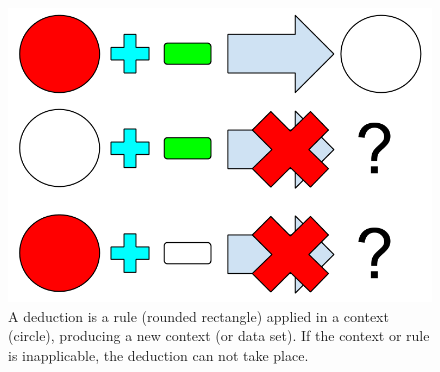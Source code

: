\begin{figure}[h]
  \includegraphics[scale=0.5]{figures/deduction}
  \caption[A deduction is a rule applied in a context]
          {A deduction is a rule (rounded rectangle) applied in a 
           context (circle), producing a new context (or data set).  
           If the context or rule is inapplicable, the deduction can
           not take place. }
  \label{deduction}
\end{figure}

